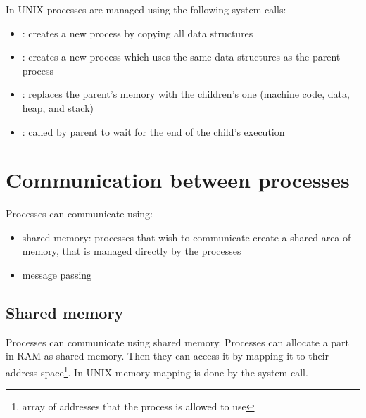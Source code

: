 In UNIX processes are managed using the following system calls:
\begin{itemize}
  \item {}: creates a new process by copying all data structures
  \item {}: creates a new process which uses the same data structures as the parent process
  \item {}: replaces the parent's memory with the children's one (machine code, data, heap, and stack)
  \item {}: called by parent to wait for the end of the child's execution
\end{itemize}



\section{Communication between processes}
Processes can communicate using:
\begin{itemize}
  \item shared memory: processes that wish to communicate create a shared area of memory, that is managed directly by the processes
  \item message passing
\end{itemize}


\subsection{Shared memory}
Processes can communicate using shared memory. Processes can allocate a part in RAM as shared memory. Then they can access it by mapping it to their address space\footnote{array of addresses that the process is allowed to use}. In UNIX memory mapping is done by the  system call.


